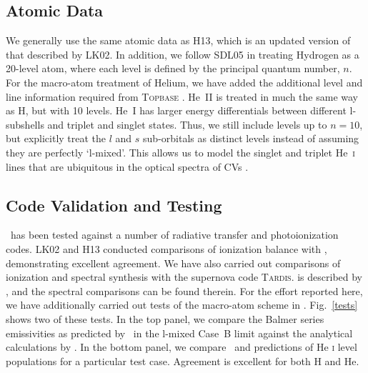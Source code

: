 \documentclass[preprint, a4paper, 11pt]{aastex}
\begin{document}
\subsection{Atomic Data}

We generally use the same atomic data as H13, which is an updated
version of that described by LK02. In addition, we follow SDL05 in
treating Hydrogen as a 20-level atom, where each level is defined by
the principal quantum number, $n$. For the macro-atom treatment of
Helium, we have added the additional level and line information required 
from \textsc{Topbase} \citep{topbase2005}.  He~\textsc{II} is treated
in much the same way as H, but with 10 levels. He~\textsc{I} has
larger energy differentials between different l-subshells and triplet
and singlet states. Thus, we still include levels up to $n=10$, but
explicitly treat the $l$ and $s$ sub-orbitals as distinct levels
instead of assuming they are perfectly `l-mixed'. This allows us
to model the singlet and  triplet He~\textsc{i} lines that are ubiquitous
in the optical spectra of CVs \citep[e.g.][]{dhillon1996}.


\subsection{Code Validation and Testing}

\py\ has been tested against a number of radiative transfer and
photoionization codes. LK02 and H13 conducted comparisons of 
ionization balance  with \cld \citep{cloudy2013}, demonstrating
excellent agreement. We have also carried out comparisons
of ionization and spectral synthesis with the supernova code
\textsc{Tardis.} \tar is described by 
\cite{kerzendorfsim}, and the spectral comparisons can be found
therein. For the effort reported here, we have additionally carried
out tests of the macro-atom scheme in \py. Fig.~\ref{tests} shows
two of these tests. In the top panel, we compare the Balmer series 
emissivities as predicted by \py\ in the l-mixed Case~B limit against the
analytical calculations by \cite{seaton1959}. In the bottom panel, we
compare \py\ and \tar predictions of  He \textsc{i} level populations
for a particular test case. Agreement is excellent for both H and He.
\end{document}
